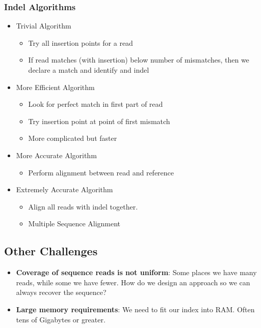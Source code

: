 \documentclass[10pt]{article}
\begin{document}
\subsubsection*{Indel Algorithms}
\begin{itemize}
    \item Trivial Algorithm
    \begin{itemize}
        \item Try all insertion points for a read
        \item If read matches (with insertion) below number of mismatches, then we declare a match and identify and indel
    \end{itemize}
    \item More Efficient Algorithm
    \begin{itemize}
        \item Look for perfect match in first part of read
        \item Try insertion point at point of first mismatch
        \item More complicated but faster
    \end{itemize}
    \item More Accurate Algorithm
    \begin{itemize}
        \item Perform alignment between read and reference
    \end{itemize}
    \item Extremely Accurate Algorithm
    \begin{itemize}
        \item Align all reads with indel together.
        \item Multiple Sequence Alignment
    \end{itemize}
\end{itemize}
\subsection*{Other Challenges}
\begin{itemize}
    \item \textbf{Coverage of sequence reads is not uniform}: Some places we have many reads, while some we have fewer.  How do we design an approach so we can always recover the sequence?
    \item \textbf{Large memory requirements}: We need to fit our index into RAM.  Often tens of Gigabytes or greater.
\end{itemize}
\end{document}
